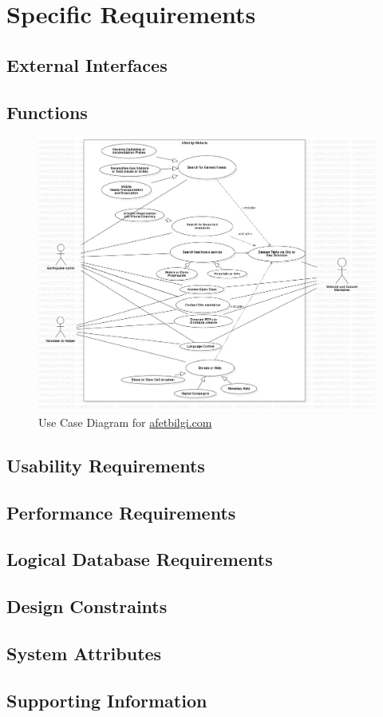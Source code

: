 \section{Specific Requirements}

\subsection{External Interfaces}

\subsection{Functions}

\begin{figure}[H]
  \centering
  \includegraphics[width=\textwidth]{img/use-case-diagram.jpg}
  \caption{Use Case Diagram for \href{https://afetbilgi.com}{afetbilgi.com}}
\end{figure}

\subsection{Usability Requirements}

\subsection{Performance Requirements}

\subsection{Logical Database Requirements}

\subsection{Design Constraints}

\subsection{System Attributes}

\subsection{Supporting Information}
